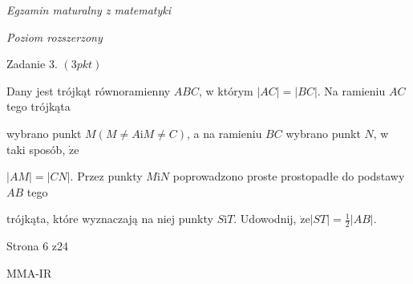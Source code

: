\documentclass[a4paper,12pt]{article}
\begin{document}
{\it Egzamin maturalny z matematyki}

{\it Poziom rozszerzony}

Zadanie 3. $(3pkt)$

Dany jest trójkąt równoramienny $ABC$, w którym $|AC|=|BC|$. Na ramieniu $AC$ tego trójkąta

wybrano punkt $M(M\neq A\mathrm{i}M\neq C)$, a na ramieniu $BC$ wybrano punkt $N$, w taki sposób, $\dot{\mathrm{z}}\mathrm{e}$

$|AM|=|CN|$. Przez punkty $M\mathrm{i}N$ poprowadzono proste prostopadłe do podstawy $AB$ tego

trójkąta, które wyznaczają na niej punkty $S\mathrm{i}T$. Udowodnij, $\displaystyle \dot{\mathrm{z}}\mathrm{e}|ST|=\frac{1}{2}|AB|.$

Strona 6 z24

MMA-IR
\end{document}
